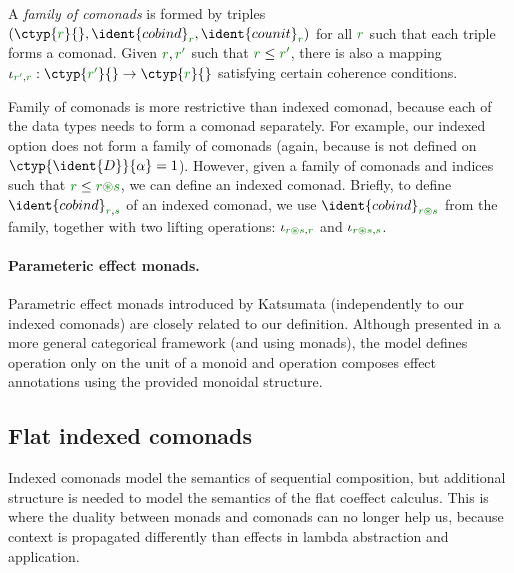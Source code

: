 \begin{definition}
\label{def:flat-family}
A \emph{family of comonads} is formed by triples $(\ctyp{\cclrd{r}}{}, \ident{cobind}_{\cclrd{r}}, 
  \ident{counit}_{\cclrd{r}})$ for all $\cclrd{r}$ such that each triple forms a comonad. Given 
$\cclrd{r}, \cclrd{r'}$ such that $\cclrd{r} \leq \cclrd{r'}$, there is also a mapping 
$\iota_{\cclrd{r'}, \cclrd{r}} : \ctyp{\cclrd{r'}}{} \rightarrow \ctyp{\cclrd{r}}{}$ satisfying
certain coherence conditions.
\end{definition}

Family of comonads is more restrictive than indexed comonad, because each of the data types needs
to form a comonad separately. For example, our indexed option does not form a family of comonads
(again, because  is not defined on $\ctyp{\ident{D}}{\alpha}=1$). However, given a 
family of comonads and indices such that $\cclrd{r} \leq \cclrd{r}\cseq\cclrd{s}$, we can define 
an indexed comonad. Briefly, to define $\ident{cobind}_{\cclrd{r},\cclrd{s}}$ of an indexed comonad, 
we use $\ident{cobind}_{\cclrd{r}\cseq\cclrd{s}}$ from the family, together with two lifting operations:
$\iota_{\cclrd{r}\cseq\cclrd{s}, \cclrd{r}}$ and $\iota_{\cclrd{r}\cseq\cclrd{s}, \cclrd{s}}$.

\paragraph{Parameteric effect monads.}
Parametric effect monads introduced by Katsumata \cite{monads-parametric} (independently to our 
indexed comonads) are closely related to our definition.  Although presented in a more general 
categorical framework (and using monads), the model defines  operation only on the 
unit of a monoid and  operation composes effect annotations using the provided monoidal 
structure.



\subsection{Flat indexed comonads}
\label{sec:flat-semantics-monoidal}

Indexed comonads model the semantics of sequential composition, but additional structure is needed
to model the semantics of the flat coeffect calculus. This is where the duality between monads and 
comonads can no longer help us, because context is propagated differently than effects in lambda 
abstraction and application.

